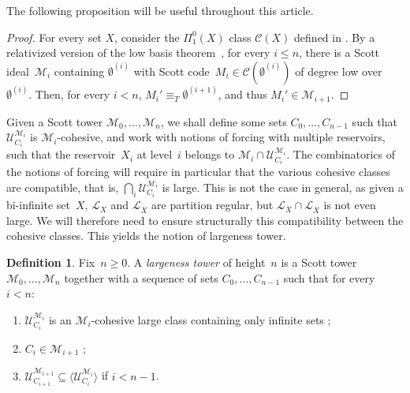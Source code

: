 \documentclass{article}
\def\U{\mathcal{U}}
\def\C{\mathcal{C}}
\def\M{\mathcal{M}}
\renewcommand{\L}[0]{\mathcal{L}}
\numberwithin{theorem}{section}
\newtheorem{proposition}[theorem]{Proposition}
\theoremstyle{definition}
\newtheorem{definition}[theorem]{Definition}
\begin{document}
The following proposition will be useful throughout this article.

\begin{proof}
For every set $X$, consider the $\Pi^0_1(X)$ class $\C(X)$ defined in .
By a relativized version of the low basis theorem~\cite{jockusch1972classes}, for every $i \leq n$, there is a Scott ideal~$\M_i$ containing $\emptyset^{(i)}$ with Scott code~$M_i \in \C(\emptyset^{(i)})$ of degree low over $\emptyset^{(i)}$. Then, for every $i < n$, $M_i' \equiv_T \emptyset^{(i+1)}$, and thus $M_i' \in \M_{i+1}$.
\end{proof}

Given a Scott tower $\M_0, \dots, \M_n$, we shall define some sets $C_0, \dots, C_{n-1}$ such that $\U^{\M_i}_{C_i}$ is $\M_i$-cohesive, and work with notions of forcing with multiple reservoirs, such that the reservoir~$X_i$ at level~$i$ belongs to $\M_i \cap \U^{\M_i}_{C_i}$. The combinatorics of the notions of forcing will require in particular that the various cohesive classes are compatible, that is, $\bigcap_i \U^{\M_i}_{C_i}$ is large. This is not the case in general, as given a bi-infinite set~$X$, $\L_X$ and $\L_{\overline{X}}$ are partition regular, but $\L_X \cap \L_{\overline{X}}$ is not even large. We will therefore need to ensure structurally this compatibility between the cohesive classes. This yields the notion of largeness tower.

\begin{definition}
Fix~$n \geq 0$. A \emph{largeness tower} of height~$n$ is a Scott tower $\M_0, \dots, \M_n$
together with a sequence of sets  $C_0, \dots, C_{n-1}$ such that for every~$i < n$:
\begin{enumerate}
    \item $\U_{C_i}^{\M_i}$ is an $\M_i$-cohesive large class containing only infinite sets ;
    \item $C_i \in \M_{i+1}$ ;
    \item $\U_{C_{i+1}}^{\M_{i+1}} \subseteq \langle \U_{C_i}^{\M_i} \rangle$ if $i < n-1$.
\end{enumerate}
\end{definition}
\end{document}
